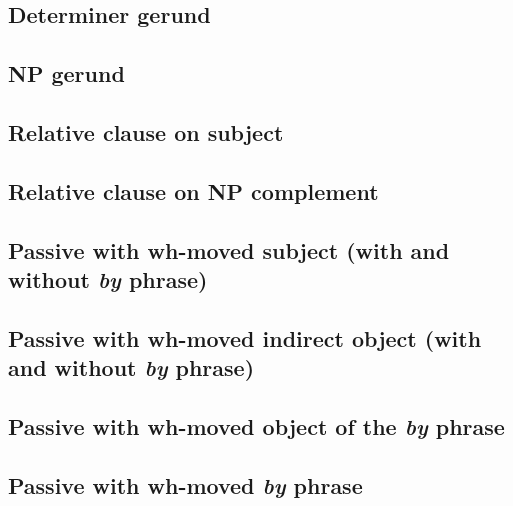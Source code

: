 \subsection{Determiner gerund}
\subsection{NP gerund}
\subsection{Relative clause on subject}


\subsection{Relative clause on NP complement}



\subsection{Passive with wh-moved subject (with and without {\it by}
phrase)}


\subsection{Passive with wh-moved indirect object (with and without {\it by} phrase)}
\subsection{Passive with wh-moved object of the {\it by} phrase}
\subsection{Passive with wh-moved {\it by} phrase}







